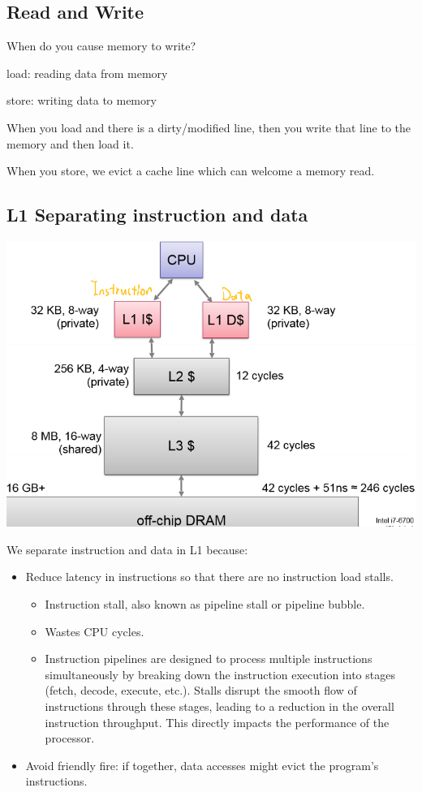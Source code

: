 \documentclass[letterpaper,12pt]{article}
\begin{document}
\subsection{Read and Write}
When do you cause memory to write?

load: reading data from memory

store: writing data to memory

When you load and there is a dirty/modified line, then you write that line to the memory and then load it.

When you store, we evict a cache line which can welcome a memory read.

\subsection{L1 Separating instruction and data}

\includegraphics*{./Image/Instruction and Data separation.png}

We separate instruction and data in L1 because:
\begin{itemize}
    \item Reduce latency in instructions so that there are no instruction load stalls.
          \begin{itemize}
              \item Instruction stall, also known as pipeline stall or pipeline bubble.
              \item Wastes CPU cycles.
              \item Instruction pipelines are designed to process multiple instructions simultaneously by breaking down the instruction execution into stages (fetch, decode, execute, etc.). Stalls disrupt the smooth flow of instructions through these stages, leading to a reduction in the overall instruction throughput. This directly impacts the performance of the processor.
          \end{itemize}
    \item Avoid friendly fire: if together, data accesses might evict the program's instructions.
\end{itemize}
\end{document}

